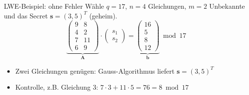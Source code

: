 \begin{frame}{LWE-Beispiel: ohne Fehler}
    Wähle $q = 17$, $n = 4$ Gleichungen, $m = 2$ Unbekannte und das Secret $\mathbf{s} = (3, 5)^T$ (geheim).
    \[
        \underbrace{\begin{pmatrix}
            9 & 8 \\ 4 & 2 \\ 7 & 11 \\ 6 & 9
        \end{pmatrix}}_{\mathbf{A}}
        \cdot
        \begin{pmatrix} s_1 \\ s_2 \end{pmatrix}
        =
        \underbrace{\begin{pmatrix} 16 \\ 5 \\ 8 \\ 12 \end{pmatrix}}_{\mathbf{b}}
        \bmod 17
    \]
    \begin{itemize}
        \item Zwei Gleichungen genügen: Gauss-Algorithmus liefert $\mathbf{s} = (3, 5)^T$
        \item Kontrolle, z.B. Gleichung 3: $7 \cdot 3 + 11 \cdot 5 = 76 = 8 \bmod 17$
    \end{itemize}
\end{frame}


